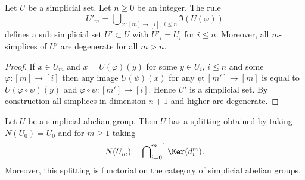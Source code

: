 \begin{lemma}
\label{lemma-simplicial-set-n-skel-sub}
Let $U$ be a simplicial set.
Let $n \geq 0$ be an integer.
The rule
$$
U'_m = \bigcup\nolimits_{\varphi : [m] \to [i], \ i\leq n} \Im(U(\varphi))
$$
defines a sub simplicial set $U' \subset U$ with
$U'_i = U_i$ for $i \leq n$.
Moreover, all $m$-simplices of $U'$ are degenerate for
all $m > n$.
\end{lemma}

\begin{proof}
If $x \in U_m$ and $x = U(\varphi)(y)$
for some $y \in U_i$, $i \leq n$ and some $\varphi : [m] \to [i]$
then any image $U(\psi)(x)$ for any $\psi : [m'] \to [m]$ is
equal to $U(\varphi \circ \psi)(y)$ and $\varphi \circ \psi :
[m'] \to [i]$. Hence $U'$ is a simplicial set. By construction
all simplices in dimension $n + 1$ and higher are degenerate.
\end{proof}

\begin{lemma}
\label{lemma-splitting-simplicial-groups}
Let $U$ be a simplicial abelian group.
Then $U$ has a splitting obtained by taking $N(U_0) = U_0$ and
for $m \geq 1$ taking
$$
N(U_m) = \bigcap\nolimits_{i = 0}^{m - 1} \Ker(d^m_i).
$$
Moreover, this splitting is functorial on the category
of simplicial abelian groups.
\end{lemma}

